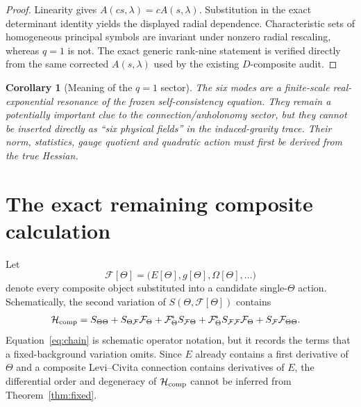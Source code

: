 \documentclass[11pt,a4paper]{article}
\newtheorem{corollary}[theorem]{Corollary}
\newcommand{\Hess}{\mathcal H}
\newcommand{\Fcal}{\mathcal F}
\begin{document}
\begin{proof}
Linearity gives $A(cs,\lambda)=cA(s,\lambda)$.  Substitution in the exact
determinant identity yields the displayed radial dependence.  Characteristic
sets of homogeneous principal symbols are invariant under nonzero radial
rescaling, whereas $q=1$ is not.  The exact generic rank-nine statement is
verified directly from the same corrected $A(s,\lambda)$ used by the existing
$D$-composite audit.
\end{proof}

\begin{corollary}[Meaning of the $q=1$ sector]
The six modes are a finite-scale real-exponential resonance of the frozen
self-consistency equation.  They remain a potentially important clue to the
connection/anholonomy sector, but they cannot be inserted directly as
``six physical fields'' in the induced-gravity trace.  Their norm, statistics,
gauge quotient and quadratic action must first be derived from the true
Hessian.
\end{corollary}

\section{The exact remaining composite calculation}
Let
\begin{equation}
 \Fcal[\Theta]=\bigl(E[\Theta],g[\Theta],\Omega[\Theta],\ldots\bigr)
\end{equation}
denote every composite object substituted into a candidate single-$\Theta$
action.  Schematically, the second variation of
$S(\Theta,\Fcal[\Theta])$ contains
\begin{align}
 \Hess_{\rm comp}
 ={}&S_{\Theta\Theta}
 +S_{\Theta\Fcal}\Fcal_\Theta
 +\Fcal_\Theta^{\!*}S_{\Fcal\Theta}
 +\Fcal_\Theta^{\!*}S_{\Fcal\Fcal}\Fcal_\Theta
 +S_{\Fcal}\Fcal_{\Theta\Theta}.
 \label{eq:chain}
\end{align}
Equation~\eqref{eq:chain} is schematic operator notation, but it records the
terms that a fixed-background variation omits.  Since $E$ already contains a
first derivative of $\Theta$ and a composite Levi--Civita connection contains
derivatives of $E$, the differential order and degeneracy of
$\Hess_{\rm comp}$ cannot be inferred from Theorem~\ref{thm:fixed}.
\end{document}
